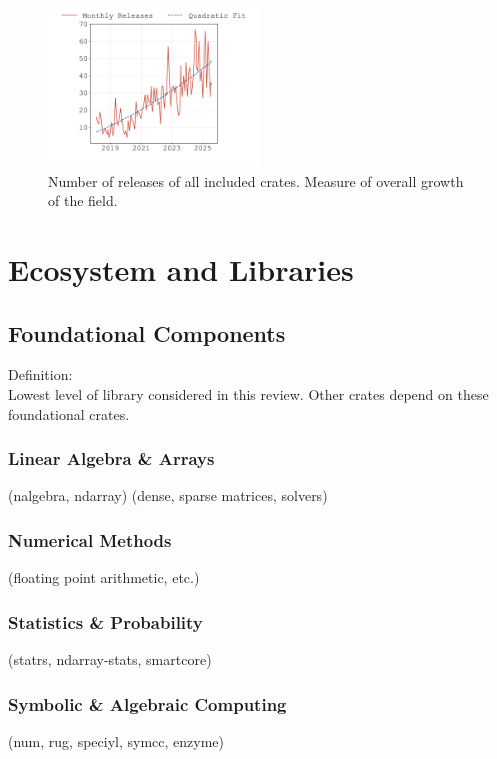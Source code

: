 \documentclass{article}
\begin{document}
\begin{figure}
    \centering
    \includegraphics[width=0.5\textwidth]{figures/crates-io-release-numbers.pdf}
    \caption{
        Number of releases of all included crates.
        Measure of overall growth of the field.
    }
\end{figure}

\section{Ecosystem and Libraries}

\subsection{Foundational Components}
Definition:\\
Lowest level of library considered in this review. Other crates depend on these
foundational crates.

\subsubsection{Linear Algebra \& Arrays}
(nalgebra, ndarray) (dense, sparse matrices, solvers)

\subsubsection{Numerical Methods}
(floating point arithmetic, etc.)

\subsubsection{Statistics \& Probability}
(statrs, ndarray-stats, smartcore)

\subsubsection{Symbolic \& Algebraic Computing}
(num, rug, speciyl, symcc, enzyme)
\end{document}

